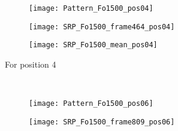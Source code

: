 \begin{figure}
  \begin{subfigure}[t]{0.47\textwidth}
    \begin{minipage}[t]{\textwidth}
      \begin{subfigure}[t]{0.3\textwidth}
        \texttt{[image: Pattern\_Fo1500\_pos04]}
        \label{fig:Pattern_Fo1500_pos04}
      \end{subfigure}
      \begin{subfigure}[t]{0.3\textwidth}
        \texttt{[image: SRP\_Fo1500\_frame464\_pos04]}
        \label{fig:SRP_pos04}
      \end{subfigure}
      \begin{subfigure}[t]{0.3\textwidth}
        \texttt{[image: SRP\_Fo1500\_mean\_pos04]}
        \label{fig:SRP_Fo1500_mean_pos04}
      \end{subfigure}
      \vspace{\verticalSpacingSRPMaps}
      \caption{\centering For position 4}
      \vspace{0.25cm}
    \end{minipage}
  \end{subfigure}
  ~%
  \begin{subfigure}[t]{0.47\textwidth}
    \begin{minipage}[t]{\textwidth}
      \begin{subfigure}[t]{0.3\textwidth}
        \texttt{[image: Pattern\_Fo1500\_pos06]}
        \label{fig:Pattern_Fo1500_pos06}
      \end{subfigure}
      \begin{subfigure}[t]{0.3\textwidth}
        \texttt{[image: SRP\_Fo1500\_frame809\_pos06]}

\end{subfigure}
\end{minipage}
\end{subfigure}
\end{figure}
